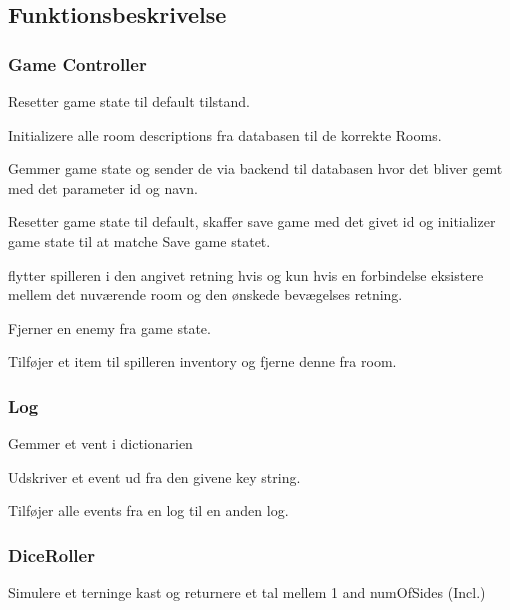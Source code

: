 \subsection{Funktionsbeskrivelse}

\subsubsection{Game Controller}

{%
  Resetter game state til default tilstand.
}

{%
  Initializere alle room descriptions fra databasen til de korrekte Rooms.
}

{%
  Gemmer game state og sender de via backend til databasen hvor det bliver gemt med det parameter id og navn.  
}

{%
  Resetter game state til default, skaffer
  save game med det givet id og initializer
  game state til at matche Save game statet.
}

{%
  flytter spilleren i den angivet retning
  hvis og kun hvis en forbindelse eksistere
  mellem det nuværende room og den ønskede
  bevægelses retning.
}

{%
  Fjerner en enemy fra game state.
}

{%
  Tilføjer et item til spilleren inventory og 
  fjerne denne fra room.
}

\subsubsection{Log}

{%
  Gemmer et vent i dictionarien
}

{%
  Udskriver et event ud fra den givene key string.
}

{%
  Tilføjer alle events fra en log til en anden log.
}

\subsubsection{DiceRoller}

{%
  Simulere et terninge kast og returnere et tal mellem  1 and numOfSides (Incl.)
}


